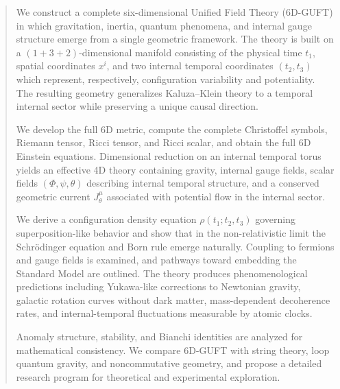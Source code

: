 \documentclass[12pt]{article}
\begin{document}
\newpage
\begin{abstract}

We construct a complete six-dimensional Unified Field Theory (6D-GUFT) in 
which gravitation, inertia, quantum phenomena, and internal gauge structure 
emerge from a single geometric framework. The theory is built on a 
\((1+3+2)\)-dimensional manifold consisting of the physical time \(t_1\), spatial 
coordinates \(x^i\), and two internal temporal coordinates \((t_2,t_3)\) which 
represent, respectively, configuration variability and potentiality. The 
resulting geometry generalizes Kaluza--Klein theory to a temporal internal 
sector while preserving a unique causal direction.

We develop the full 6D metric, compute the complete Christoffel symbols, 
Riemann tensor, Ricci tensor, and Ricci scalar, and obtain the full 6D 
Einstein equations. Dimensional reduction on an internal temporal torus yields 
an effective 4D theory containing gravity, internal gauge fields, scalar 
fields \((\Phi,\psi,\theta)\) describing internal temporal structure, and a 
conserved geometric current \(J_\theta^\mu\) associated with potential flow in 
the internal sector.

We derive a configuration density equation \(\rho(t_1; t_2, t_3)\) governing 
superposition-like behavior and show that in the non-relativistic limit the 
Schrödinger equation and Born rule emerge naturally. Coupling to fermions and 
gauge fields is examined, and pathways toward embedding the Standard Model are 
outlined. The theory produces phenomenological predictions including 
Yukawa-like corrections to Newtonian gravity, galactic rotation curves without 
dark matter, mass-dependent decoherence rates, and internal-temporal 
fluctuations measurable by atomic clocks.

Anomaly structure, stability, and Bianchi identities are analyzed for 
mathematical consistency. We compare 6D-GUFT with string theory, loop quantum 
gravity, and noncommutative geometry, and propose a detailed research program 
for theoretical and experimental exploration.

\end{abstract}


\newpage
\end{document}
